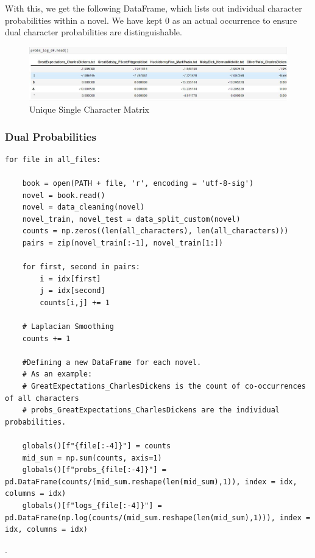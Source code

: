 With this, we get the following DataFrame, which lists out individual character probabilities within a novel. We have kept 0 as an actual occurrence to ensure dual character probabilities are distinguishable.

\begin{figure}[H]
	\begin{center}
		\includegraphics[width = 1.0\textwidth]{Images/single_char_probs.JPG} %
		\caption{Unique Single Character Matrix}
		\label{fig:single-char-prob-matrix}
	\end{center}
\end{figure}

\subsubsection{Dual Probabilities}
\label{sec:dual-char-probs}
\vspace{0.5cm}

\begin{code}
\label{code:transition-matrix}
\begin{verbatim}
for file in all_files:
            
    book = open(PATH + file, 'r', encoding = 'utf-8-sig')
    novel = book.read()
    novel = data_cleaning(novel)
    novel_train, novel_test = data_split_custom(novel)
    counts = np.zeros((len(all_characters), len(all_characters)))
    pairs = zip(novel_train[:-1], novel_train[1:])
    
    for first, second in pairs:
        i = idx[first]
        j = idx[second]
        counts[i,j] += 1
    
    # Laplacian Smoothing
    counts += 1 
    
    #Defining a new DataFrame for each novel. 
    # As an example:
    # GreatExpectations_CharlesDickens is the count of co-occurrences of all characters
    # probs_GreatExpectations_CharlesDickens are the individual probabilities. 
    
    globals()[f"{file[:-4]}"] = counts
    mid_sum = np.sum(counts, axis=1)
    globals()[f"probs_{file[:-4]}"] = pd.DataFrame(counts/(mid_sum.reshape(len(mid_sum),1)), index = idx, columns = idx)
    globals()[f"logs_{file[:-4]}"] = pd.DataFrame(np.log(counts/(mid_sum.reshape(len(mid_sum),1))), index = idx, columns = idx)    
\end{verbatim}
\caption{Loop generates multiple DataFrames with Dual Character Probabilities}.
\end{code}


